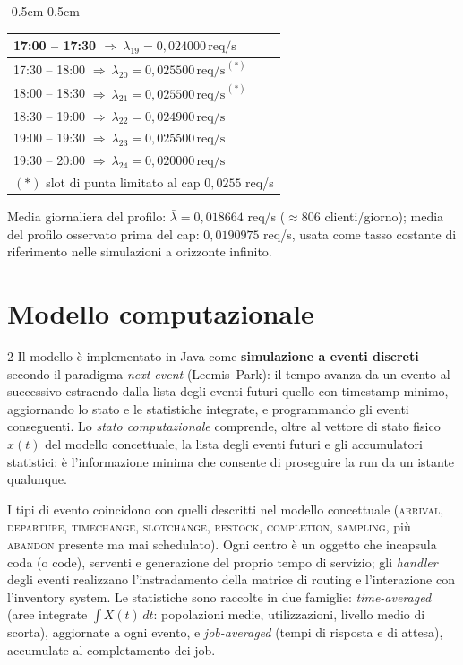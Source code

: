 \documentclass{article}
\begin{document}
\begin{adjustwidth}{-0.5cm}{-0.5cm}
\begin{minipage}[t]{0.48\textwidth}
\begin{center}
\begin{tabular}{|l|}
17:00 -- 17:30 $\Rightarrow\ \lambda_{19}=0{,}024000\,\text{req/s}$ \\ \hline
17:30 -- 18:00 $\Rightarrow\ \lambda_{20}=0{,}025500\,\text{req/s}^{\,(\ast)}$ \\ \hline
18:00 -- 18:30 $\Rightarrow\ \lambda_{21}=0{,}025500\,\text{req/s}^{\,(\ast)}$ \\ \hline
18:30 -- 19:00 $\Rightarrow\ \lambda_{22}=0{,}024900\,\text{req/s}$ \\ \hline
19:00 -- 19:30 $\Rightarrow\ \lambda_{23}=0{,}025500\,\text{req/s}$ \\ \hline
19:30 -- 20:00 $\Rightarrow\ \lambda_{24}=0{,}020000\,\text{req/s}$ \\ \hline
\multicolumn{1}{|l|}{\footnotesize $(\ast)$ slot di punta limitato al cap $0{,}0255$ req/s} \\ \hline
\end{tabular}
\end{center}
Media giornaliera del profilo: $\bar{\lambda} = 0{,}018664$ req/s ($\approx 806$ clienti/giorno);
media del profilo osservato prima del cap: $0{,}0190975$ req/s, usata come tasso costante di
riferimento nelle simulazioni a orizzonte infinito.
\end{minipage}

\newpage
\section{Modello computazionale}
\begin{multicols}{2}
Il modello è implementato in Java come \textbf{simulazione a eventi discreti} secondo il paradigma
\emph{next-event} (Leemis--Park): il tempo avanza da un evento al successivo estraendo dalla lista
degli eventi futuri quello con timestamp minimo, aggiornando lo stato e le statistiche integrate,
e programmando gli eventi conseguenti. Lo \emph{stato computazionale} comprende, oltre al vettore
di stato fisico $x(t)$ del modello concettuale, la lista degli eventi futuri e gli accumulatori
statistici: è l'informazione minima che consente di proseguire la run da un istante qualunque.

I tipi di evento coincidono con quelli descritti nel modello concettuale (\textsc{arrival},
\textsc{departure}, \textsc{timechange}, \textsc{slotchange}, \textsc{restock},
\textsc{completion}, \textsc{sampling}, più \textsc{abandon} presente ma mai schedulato). Ogni
centro è un oggetto che incapsula coda (o code), serventi e generazione del proprio tempo di
servizio; gli \emph{handler} degli eventi realizzano l'instradamento della matrice di routing e
l'interazione con l'inventory system. Le statistiche sono raccolte in due famiglie:
\emph{time-averaged} (aree integrate $\int X(t)\,dt$: popolazioni medie, utilizzazioni, livello
medio di scorta), aggiornate a ogni evento, e \emph{job-averaged} (tempi di risposta e di attesa),
accumulate al completamento dei job.


\end{multicols}
\end{adjustwidth}
\end{document}
